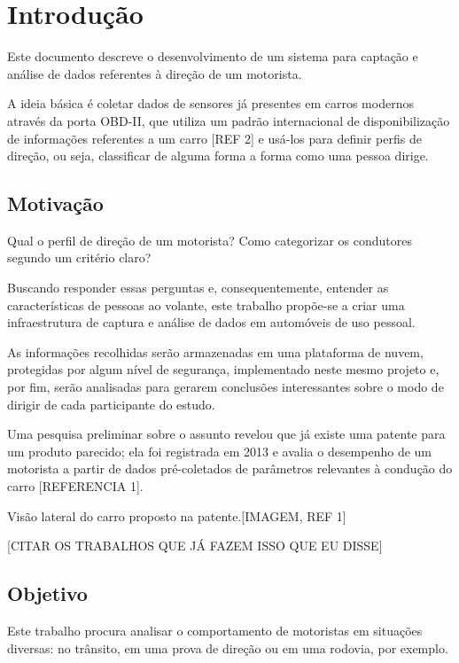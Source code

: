 \chapter{Introdução}\label{CAP:introducao}

Este documento descreve o desenvolvimento de um sistema para captação e análise de dados referentes à direção de um motorista.

A ideia básica é coletar dados de sensores já presentes em carros modernos através da porta OBD-II, que utiliza um padrão internacional de disponibilização de informações referentes a um carro [REF 2] e usá-los para definir perfis de direção, ou seja, classificar de alguma forma a forma como uma pessoa dirige.

\section{Motivação}

Qual o perfil de direção de um motorista? Como categorizar os condutores segundo um critério claro?

Buscando responder essas perguntas e, consequentemente, entender as características de pessoas ao volante, este trabalho propõe-se a criar uma infraestrutura de captura e análise de dados em automóveis de uso pessoal.

As informações recolhidas serão armazenadas em uma plataforma de nuvem, protegidas por algum nível de segurança, implementado neste mesmo projeto e, por fim, serão analisadas para gerarem conclusões interessantes sobre o modo de dirigir de cada participante do estudo.
	
Uma pesquisa preliminar sobre o assunto revelou que já existe uma patente para um produto parecido; ela foi registrada em 2013 e avalia o desempenho de um motorista a partir de dados pré-coletados de parâmetros relevantes à condução do carro [REFERENCIA 1].

Visão lateral do carro proposto na patente.[IMAGEM, REF 1]

[CITAR OS TRABALHOS QUE JÁ FAZEM ISSO QUE EU DISSE]

\section{Objetivo}

Este trabalho procura analisar o comportamento de motoristas em situações diversas: no trânsito, em uma prova de direção ou em uma rodovia, por exemplo.

